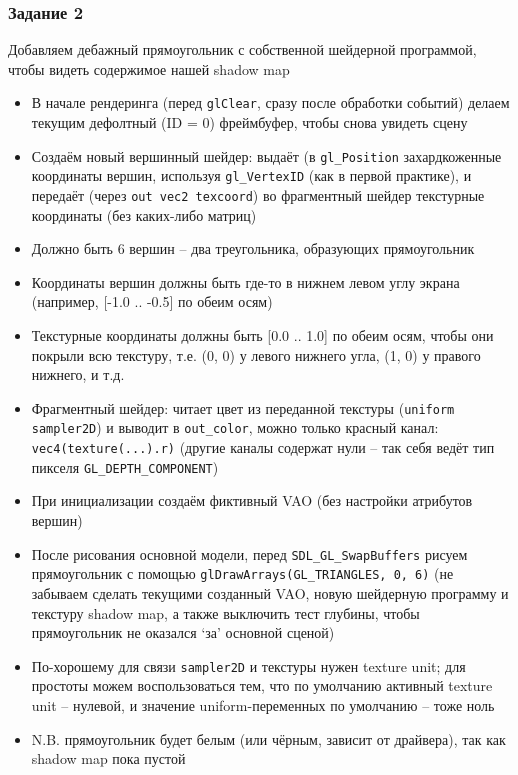 \documentclass{beamer}
\begin{document}
\begin{frame}[fragile]
\frametitle{Задание 2}
\begin{tiny}
Добавляем дебажный прямоугольник с собственной шейдерной программой, чтобы видеть содержимое нашей shadow map
\begin{itemize}
\item В начале рендеринга (перед \verb|glClear|, сразу после обработки событий) делаем текущим дефолтный (ID = 0) фреймбуфер, чтобы снова увидеть сцену
\item Создаём новый вершинный шейдер: выдаёт (в \verb|gl_Position| захардкоженные координаты вершин, используя \verb|gl_VertexID| (как в первой практике), и передаёт (через \verb|out vec2 texcoord|) во фрагментный шейдер текстурные координаты (без каких-либо матриц)
\item Должно быть 6 вершин -- два треугольника, образующих прямоугольник
\item Координаты вершин должны быть где-то в нижнем левом углу экрана (например, [-1.0 .. -0.5] по обеим осям)
\item Текстурные координаты должны быть [0.0 .. 1.0] по обеим осям, чтобы они покрыли всю текстуру, т.е. (0, 0) у левого нижнего угла, (1, 0) у правого нижнего, и т.д.
\item Фрагментный шейдер: читает цвет из переданной текстуры (\verb|uniform sampler2D|) и выводит в \verb|out_color|, можно только красный канал: \verb|vec4(texture(...).r)| (другие каналы содержат нули -- так себя ведёт тип пикселя \verb|GL_DEPTH_COMPONENT|)
\item При инициализации создаём фиктивный VAO (без настройки атрибутов вершин)
\item После рисования основной модели, перед \verb|SDL_GL_SwapBuffers| рисуем прямоугольник с помощью \verb|glDrawArrays(GL_TRIANGLES, 0, 6)| (не забываем сделать текущими созданный VAO, новую шейдерную программу и текстуру shadow map, а также выключить тест глубины, чтобы прямоугольник не оказался `за' основной сценой)
\item По-хорошему для связи \verb|sampler2D| и текстуры нужен texture unit; для простоты можем воспользоваться тем, что по умолчанию активный texture unit -- нулевой, и значение uniform-переменных по умолчанию -- тоже ноль
\item N.B. прямоугольник будет белым (или чёрным, зависит от драйвера), так как shadow map пока пустой
\end{itemize}
\end{tiny}
\end{frame}
\end{document}

